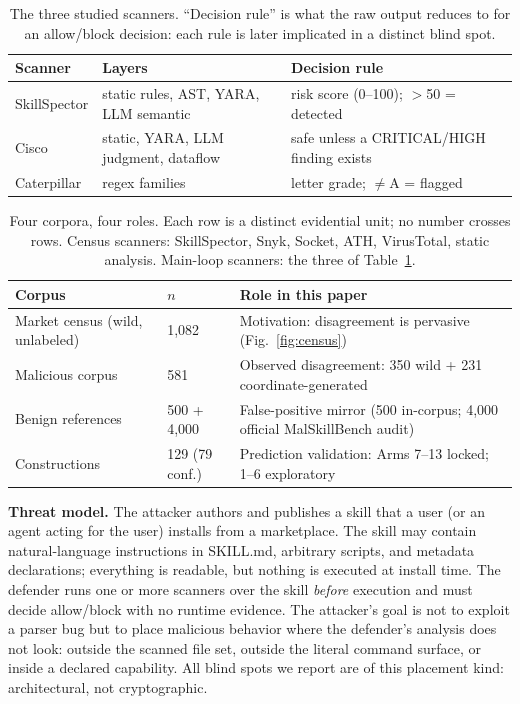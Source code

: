 \documentclass[sigconf,nonacm]{acmart}
\begin{document}
\begin{table}[t]
\caption{The three studied scanners. ``Decision rule'' is what the raw output reduces to for an allow/block decision: each rule is later implicated in a distinct blind spot.}
\label{tab:scanners}
\small
\begin{tabular}{@{}p{1.5cm}p{2.6cm}p{3.6cm}@{}}
\toprule
Scanner & Layers & Decision rule \\
\midrule
SkillSpector & static rules, AST, YARA, LLM semantic & risk score (0--100); $>$50 = detected \\
Cisco & static, YARA, LLM judgment, dataflow & safe unless a CRITICAL/HIGH finding exists \\
Caterpillar & regex families & letter grade; $\neq$A = flagged \\
\bottomrule
\end{tabular}
\end{table}

\begin{table}[t]
\caption{Four corpora, four roles. Each row is a distinct evidential unit; no number crosses rows. Census scanners: SkillSpector, Snyk, Socket, ATH, VirusTotal, static analysis. Main-loop scanners: the three of Table~\ref{tab:scanners}.}
\label{tab:datasets}
\small
\begin{tabular}{@{}p{2.7cm}p{1.5cm}p{3.6cm}@{}}
\toprule
Corpus & $n$ & Role in this paper \\
\midrule
Market census (wild, unlabeled) & 1{,}082 & Motivation: disagreement is pervasive (Fig.~\ref{fig:census}) \\
Malicious corpus & 581 & Observed disagreement: 350 wild + 231 coordinate-generated \\
Benign references & 500 + 4{,}000 & False-positive mirror (500 in-corpus; 4{,}000 official MalSkillBench audit) \\
Constructions & 129 (79 conf.) & Prediction validation: Arms 7--13 locked; 1--6 exploratory \\
\bottomrule
\end{tabular}
\end{table}

\textbf{Threat model.} The attacker authors and publishes a skill that a user (or an agent acting for the user) installs from a marketplace. The skill may contain natural-language instructions in SKILL.md, arbitrary scripts, and metadata declarations; everything is readable, but nothing is executed at install time. The defender runs one or more scanners over the skill \emph{before} execution and must decide allow/block with no runtime evidence. The attacker's goal is not to exploit a parser bug but to place malicious behavior where the defender's analysis does not look: outside the scanned file set, outside the literal command surface, or inside a declared capability. All blind spots we report are of this placement kind: architectural, not cryptographic.
\end{document}

